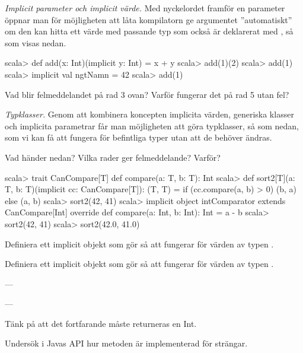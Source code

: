 \Subtask \emph{Implicit parameter och implicit värde.} Med nyckelordet  framför en parameter öppnar man för möjligheten att låta kompilatorn ge argumentet ''automatiskt'' om den kan hitta ett värde med passande typ som också är deklarerat med , så som visas nedan.
\begin{REPL}
scala> def add(x: Int)(implicit y: Int) = x + y
scala> add(1)(2)
scala> add(1)
scala> implicit val ngtNamn = 42
scala> add(1)
\end{REPL}
Vad blir felmeddelandet på rad 3 ovan? Varför fungerar det på rad 5 utan fel?

\Subtask \emph{Typklasser.} Genom att kombinera koncepten implicita värden, generiska klasser och implicita parametrar får man möjligheten att göra typklasser, så som  nedan, som vi kan få att fungera för befintliga typer utan att de behöver ändras.

Vad händer nedan? Vilka rader ger felmeddelande? Varför?

\begin{REPL}
scala> trait CanCompare[T] { def compare(a: T, b: T): Int }
scala> def sort2[T](a: T, b: T)(implicit cc: CanCompare[T]): (T, T) =
         if (cc.compare(a, b) > 0) (b, a) else (a, b)
scala> sort2(42, 41)
scala> implicit object intComparator extends CanCompare[Int]{
         override def compare(a: Int, b: Int): Int = a - b
       }
scala> sort2(42, 41)
scala> sort2(42.0, 41.0)
\end{REPL}

\Subtask Definiera ett implicit objekt som gör så att  fungerar för värden av typen .

\Subtask Definiera ett implicit objekt som gör så att  fungerar för värden av typen .


\SOLUTION


\TaskSolved \what

\SubtaskSolved ---


\SubtaskSolved ---


\SubtaskSolved
Tänk på att det fortfarande måste returneras en Int.


\SubtaskSolved
Undersök i Javas API hur metoden  är implementerad för strängar.

\QUESTEND






\QUESTBEGIN

